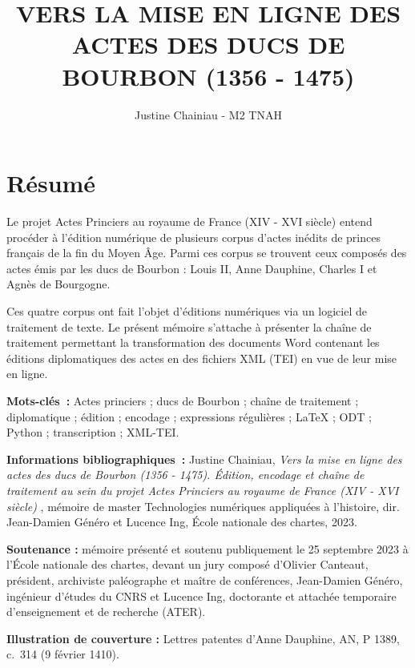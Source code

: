 \documentclass[a4paper,12pt,twoside]{book}
\author{Justine Chainiau - M2 TNAH}
\title{VERS LA MISE EN LIGNE DES ACTES DES DUCS DE BOURBON (1356 - 1475)}
\begin{document}
 
	
	\thispagestyle{empty}	
	\cleardoublepage
	
	\frontmatter
	\chapter{Résumé}
	\medskip
	Le projet \og Actes Princiers au royaume de France (\textsc{XIV} - \textsc{XVI} siècle) \fg \space entend procéder à l’édition numérique de plusieurs corpus d’actes inédits de princes français de la fin du Moyen Âge. Parmi ces corpus se trouvent ceux composés des actes émis par les ducs de Bourbon : Louis II, Anne Dauphine, Charles I et Agnès de Bourgogne. 
 \newline 
    \par Ces quatre corpus ont fait l'objet d'éditions numériques via un logiciel de traitement de texte. Le présent mémoire s'attache à présenter la chaîne de traitement permettant la transformation des documents Word contenant les éditions diplomatiques des actes en des fichiers XML (TEI) en vue de leur mise en ligne. 
	\bigskip
    \bigskip
    \bigskip
    
	\textbf{Mots-clés~:} Actes princiers ; ducs de Bourbon ; chaîne de traitement ; diplomatique ; édition ; encodage ; expressions régulières ; LaTeX ; ODT ; Python ; transcription ; XML-TEI.
 \newline 
	
	\textbf{Informations bibliographiques~:} Justine Chainiau, \textit{Vers la mise en ligne des actes des ducs de Bourbon (1356 - 1475). Édition, encodage et chaîne de traitement au sein du projet \og Actes Princiers au royaume de France (\textsc{XIV} - \textsc{XVI} siècle) \fg}, mémoire de master \og{}Technologies numériques appliquées à l'histoire\fg{}, dir. Jean-Damien Généro et Lucence Ing, École nationale des chartes, 2023.
\newline 

    \textbf{Soutenance :} mémoire présenté et soutenu publiquement le 25 septembre 2023 à l’École nationale des chartes, devant un jury composé d’Olivier Canteaut, président, archiviste paléographe et maître de conférences, Jean-Damien Généro, ingénieur d'études du CNRS et Lucence Ing, doctorante et attachée temporaire d'enseignement et de recherche (ATER).  
    \newline 

    \textbf{Illustration de couverture :} Lettres patentes d'Anne Dauphine, AN, P 1389, c.~314 (9 février 1410). 
	
\end{document}
